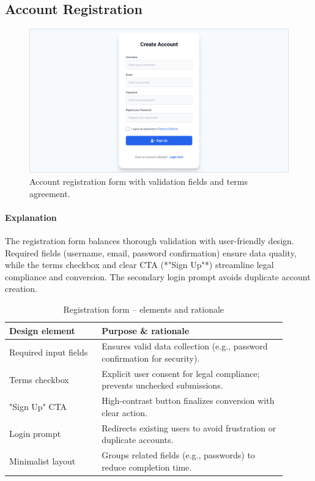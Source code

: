 \documentclass[11pt,a4paper]{article}
\begin{document}
	\subsection{Account Registration}\label{subsec:account-registration}

	\begin{figure}[H]
		\centering
		\includegraphics[width=0.6\linewidth]{pictures/main/RegisterAccount_Figma.png}%
		\caption{Account registration form with validation fields and terms agreement.}
		\label{fig:ui-register}
	\end{figure}

	\paragraph{Explanation}%
	The registration form balances thorough validation with user-friendly design. Required fields (username, email, password confirmation) ensure data quality, while the terms checkbox and clear CTA (*"Sign Up"*) streamline legal compliance and conversion. The secondary login prompt avoids duplicate account creation.

	\begin{table}[H]
		\centering
		\caption{Registration form – elements and rationale}
		\label{tab:register-elements}
		\begin{tabular}{p{0.30\linewidth} p{0.60\linewidth}}
			\toprule
			\textbf{Design element} & \textbf{Purpose \& rationale} \\ \midrule
			Required input fields   & Ensures valid data collection (e.g., password confirmation for security). \\
			Terms checkbox          & Explicit user consent for legal compliance; prevents unchecked submissions. \\
			"Sign Up" CTA          & High-contrast button finalizes conversion with clear action. \\
			Login prompt           & Redirects existing users to avoid frustration or duplicate accounts. \\
			Minimalist layout      & Groups related fields (e.g., passwords) to reduce completion time. \\
			\bottomrule
		\end{tabular}
	\end{table}
\end{document}
